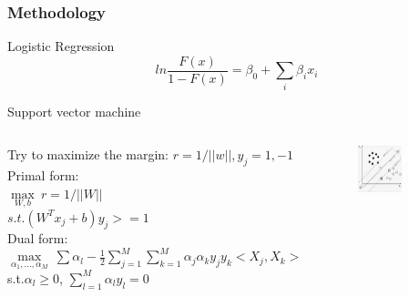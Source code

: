 \documentclass{beamer}
\begin{document}
\begin{frame}
\frametitle{Methodology}
\begin{block}{Logistic Regression}
\begin{equation}
ln{\frac{F(x)}{1-F(x)}}=\beta_0+\sum_i\beta_ix_i
\end{equation}
\end{block}
\begin{block}{Support vector machine}
\begin{columns}
\column{2.6in}
\scriptsize {
Try to maximize the margin: $r=1/||w||,y_j=1,-1$\\
Primal form:\\
$\max\limits_{W,b}\ r= 1/||W||$\\
$s.t.(W^Tx_j+b)y_j>=1$\\
Dual form:\\
$\max\limits_{\alpha_1,...,\alpha_M}\ \sum\alpha_l-\frac{1}{2}\sum_{j=1}^{M}\sum_{k=1}^{M}\alpha_j\alpha_k y_j y_k<X_j,X_k>$\\
s.t.$\alpha_l\geq 0$, $\sum_{l=1}^{M}\alpha_ly_l=0$
}
\column{2in}
\begin{figure}
     \includegraphics[width=0.6\textwidth, height=0.35\textheight]{svm.png}
\end{figure}
\end{columns}
\end{block}
\end{frame}
\end{document}
